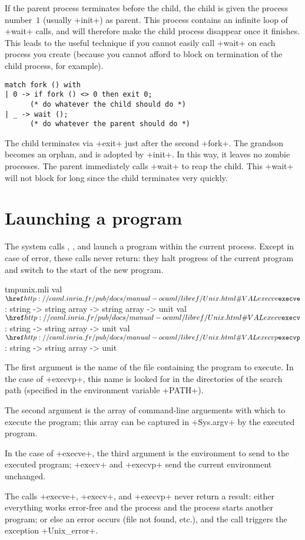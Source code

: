 If the parent process terminates before the child, the child is
given the process number~$1$ (usually \ml+init+) as parent. This
process contains an infinite loop of \ml+wait+ calls, and will
therefore make the child process disappear once it finishes. This
leads to the useful  technique if you cannot
easily call \ml+wait+ on each process you create (because you cannot
afford to block on termination of the child process,
for example).
%
\begin{lstlisting}
match fork () with
| 0 -> if fork () <> 0 then exit 0;
      (* do whatever the child should do *)
| _ -> wait ();
      (* do whatever the parent should do *)
\end{lstlisting}
%
The child terminates via \ml+exit+ just after the second \ml+fork+.
The grandson becomes an orphan, and is adopted by \ml+init+.  In this
way, it leaves no zombie processes. The parent immediately calls
\ml+wait+ to reap the child. This \ml+wait+ will not block for long
since the child terminates very quickly.

\section{Launching a program}

The system calls , , and
 launch a program within the current process.
Except in case of error, these calls never return: they halt progress
of the current program and switch to the start of the new program.
%
\begin{listingcodefile}{tmpunix.mli}
val $\libvalue{Unix}{execve}$ : string -> string array -> string array -> unit
val $\libvalue{Unix}{execv}$  : string -> string array -> unit
val $\libvalue{Unix}{execvp}$ : string -> string array -> unit
\end{listingcodefile}
%
The first argument is the name of the file containing the program to
execute. In the case of \ml+execvp+, this name is looked for in the
directories of the search path (specified in the environment variable
\ml+PATH+).

The second argument is the array of command-line arguements with which
to execute the program; this array can be captured in \ml+Sys.argv+ by
the executed program.

In the case of \ml+execve+, the third argument is the environment
to send to the executed program; \ml+execv+ and \ml+execvp+
send the current environment unchanged.

The calls \ml+execve+, \ml+execv+, and \ml+execvp+ never return a
result: either everything works error-free and the process and the
process starts another program; or else an error occurs (file not
found, etc.), and the call triggers the exception \ml+Unix_error+.

